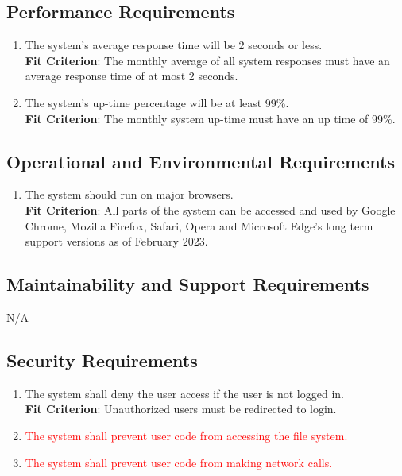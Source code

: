 \documentclass[12pt, titlepage]{article}
\begin{document}
\subsection{Performance Requirements}
\begin{enumerate}[label=NFR.\arabic*, resume]
    \item The system's average response time will be 2 seconds or less. \label{NFR.4}
    \\\textbf{Fit Criterion}: The monthly average of all system responses must have an average response time of at most 2 seconds.
    \item The system's up-time percentage will be at least 99\%.
    \\\textbf{Fit Criterion}: The monthly system up-time must have an up time of 99\%.
    \label{NFR.5}
\end{enumerate}
\subsection{Operational and Environmental Requirements}
\begin{enumerate}[label=NFR.\arabic*, resume]
    \item The system should run on major browsers. \label{NFR.6}
    \\\textbf{Fit Criterion}: All parts of the system can be accessed and used by Google Chrome, Mozilla Firefox, Safari, Opera and Microsoft Edge's long term support versions as of February 2023.
\end{enumerate}
\subsection{Maintainability and Support Requirements}
N/A
\subsection{Security Requirements}
\begin{enumerate}[label=NFR.\arabic*, resume]
    \item The system shall deny the user access if the user is not logged in. \label{NFR.7}
    \\\textbf{Fit Criterion}: Unauthorized users must be redirected to login.
    \item \textcolor{red}{The system shall prevent user code from accessing the file system.}\label{NFR.8}
    \item \textcolor{red}{The system shall prevent user code from making network calls.}\label{NFR.9}
\end{enumerate}
\end{document}
